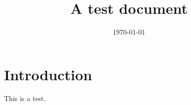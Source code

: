 \documentclass{article}
\title{A test document}
\date{\today}
\begin{document}
\maketitle

\section{Introduction}

This is a test.
\end{document}
